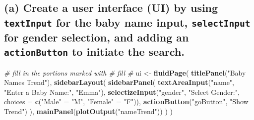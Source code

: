 \documentclass[
]{book}
\newenvironment{Shaded}{\begin{snugshade}}{\end{snugshade}}
\newcommand{\AttributeTok}[1]{\textcolor[rgb]{0.13,0.29,0.53}{#1}}
\newcommand{\CommentTok}[1]{\textcolor[rgb]{0.56,0.35,0.01}{\textit{#1}}}
\newcommand{\FunctionTok}[1]{\textcolor[rgb]{0.13,0.29,0.53}{\textbf{#1}}}
\newcommand{\NormalTok}[1]{#1}
\newcommand{\OtherTok}[1]{\textcolor[rgb]{0.56,0.35,0.01}{#1}}
\newcommand{\StringTok}[1]{\textcolor[rgb]{0.31,0.60,0.02}{#1}}
\begin{document}
\hypertarget{a-create-a-user-interface-ui-by-using-textinput-for-the-baby-name-input-selectinput-for-gender-selection-and-adding-an-actionbutton-to-initiate-the-search.}{%
\subsection{\texorpdfstring{(a) Create a user interface (UI) by using \texttt{textInput} for the baby name input, \texttt{selectInput} for gender selection, and adding an \texttt{actionButton} to initiate the search.}{(a) Create a user interface (UI) by using textInput for the baby name input, selectInput for gender selection, and adding an actionButton to initiate the search.}}\label{a-create-a-user-interface-ui-by-using-textinput-for-the-baby-name-input-selectinput-for-gender-selection-and-adding-an-actionbutton-to-initiate-the-search.}}

\begin{Shaded}
\begin{Highlighting}[]
\CommentTok{\# fill in the portions marked with \# fill \#}
\NormalTok{ui }\OtherTok{\textless{}{-}} \FunctionTok{fluidPage}\NormalTok{(}
  \FunctionTok{titlePanel}\NormalTok{(}\StringTok{"Baby Names Trend"}\NormalTok{),}
  \FunctionTok{sidebarLayout}\NormalTok{(}
    \FunctionTok{sidebarPanel}\NormalTok{(}
      \FunctionTok{textAreaInput}\NormalTok{(}\StringTok{"name"}\NormalTok{, }\StringTok{"Enter a Baby Name:"}\NormalTok{, }\StringTok{"Emma"}\NormalTok{),}
      \FunctionTok{selectizeInput}\NormalTok{(}\StringTok{"gender"}\NormalTok{, }\StringTok{"Select Gender:"}\NormalTok{, }\AttributeTok{choices =} \FunctionTok{c}\NormalTok{(}\StringTok{"Male"} \OtherTok{=} \StringTok{"M"}\NormalTok{, }\StringTok{"Female"} \OtherTok{=} \StringTok{"F"}\NormalTok{)),}
      \FunctionTok{actionButton}\NormalTok{(}\StringTok{"goButton"}\NormalTok{, }\StringTok{"Show Trend"}\NormalTok{)}
\NormalTok{    ),}
    \FunctionTok{mainPanel}\NormalTok{(}\FunctionTok{plotOutput}\NormalTok{(}\StringTok{"nameTrend"}\NormalTok{))}
\NormalTok{  )}
\NormalTok{)}
\end{Highlighting}
\end{Shaded}
\end{document}

